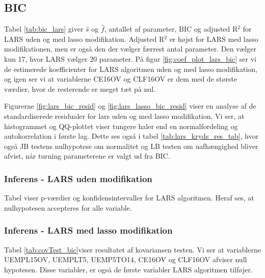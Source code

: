 \subsection{BIC}
Tabel \ref{tab:bic_lars} giver $\widehat{s}$ og $\widehat{f}$, antallet af parameter, BIC og adjusted R$^2$ for LARS uden og med lasso modifikation. 
Adjusted R$^2$ er højst for LARS med lasso modifikationen, men er også den der vælger færrest antal parameter. 
Den vælger kun 17, hvor LARS vælger 20 parameter. 
På figur \ref{fig:coef_plot_lars_bic} ser vi de estimerede koefficienter for LARS algoritmen uden og med lasso modifikation, og igen ser  vi at variablerne \textcolor{blue3}{CE16OV} og \textcolor{blue3}{CLF16OV} er dem med de største værdier, hvor de resterende er meget tæt på nul. 




Figurerne \ref{fig:lars_bic_resid} og  \ref{fig:lars_lasso_bic_resid} viser en analyse af de standardiserede residualer for lars uden og med lasso modifikation. Vi ser, at histogrammet og QQ-plottet viser tungere haler end en normalfordeling og autokorrelation i første lag. Dette ses også i tabel \ref{tab:lars_kryds_res_tab}, hvor også JB testens nulhypotese om normalitet og LB testen om uafhængighed bliver afvist, når turning parameterene er valgt ud fra BIC. 


\subsubsection{Inferens - LARS uden modifikation}
Tabel  viser p-værdier og konfidensintervaller for LARS algoritmen. Heraf ses, at nulhypotesen accepteres for alle variable.





\subsubsection{Inferens - LARS med lasso modifikation}
Tabel \ref{tab:covTest_bic}viser resultatet af  kovariansen testen. Vi ser at variablerne \textcolor{blue3}{UEMPL15OV}, \textcolor{blue3}{UEMPLT5}, \textcolor{blue3}{UEMP5TO14}, \textcolor{blue3}{CE16OV} og \textcolor{blue3}{CLF16OV} afviser null hypotesen. Disse variabler, er også de første variabler LARS algoritmen tilføjer.  

